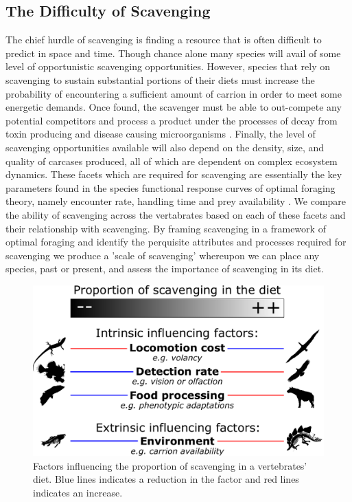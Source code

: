 \documentclass[a4paper,12pt]{article}
\begin{document}

\subsection*{The Difficulty of Scavenging} %


The chief hurdle of scavenging is finding a resource that is often difficult to predict in space and time. Though chance alone many species will avail of some level of opportunistic scavenging opportunities. However, species that rely on scavenging to sustain substantial portions of their diets must increase the probability of encountering a sufficient amount of carrion in order to meet some energetic demands. Once found, the scavenger must be able to out-compete any potential competitors and process a product under the processes of decay from toxin producing and disease causing microorganisms \citep{ruxton2014fruit}. Finally, the level of scavenging opportunities available will also depend on the density, size, and quality of carcases produced, all of which are dependent on complex ecosystem dynamics. These facets which are required for scavenging are essentially the key parameters found in the species functional response curves of optimal foraging theory, namely encounter rate, handling time and prey availability \citep{jeschke2002predator}. We compare the ability of scavenging across the vertabrates based on each of these facets and their relationship with scavenging. By framing scavenging in a framework of optimal foraging and identify the perquisite attributes and processes required for scavenging we produce a 'scale of scavenging' whereupon we can place any species, past or present, and assess the importance of scavenging in its diet. 

\begin{figure}[!htbp]
\centering
   \includegraphics[width=1\textwidth]{Summary_figure/Summary_figure_Landscape.pdf}
\caption{Factors influencing the proportion of scavenging in a vertebrates' diet. Blue lines indicates a reduction in the factor and red lines indicates an increase.}
\label{Summary_figure}
\end{figure}
\end{document}
